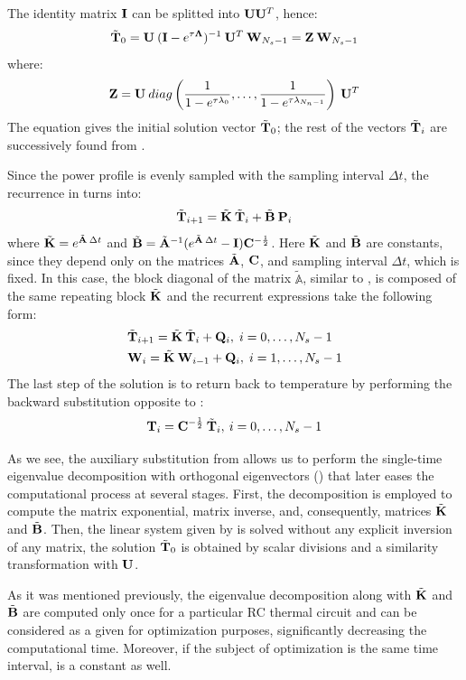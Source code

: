 The identity matrix $\mathbf{I}$ can be splitted into $\mathbf{U} \mathbf{U}^T$, hence:
\[
  \tilde{\mathbf{T}}_0 = \mathbf{U} \: (\mathbf{I} - e^{\tau \mathbf{\Lambda}})^{-1} \: \mathbf{U}^T \: \mathbf{W}_{N_s - 1} = \mathbf{Z} \: \mathbf{W}_{N_s - 1}
\]
where:
\begin{equation} \label{eq:m-matrix}
  \mathbf{Z} = \mathbf{U} \: diag \left( \frac{1}{1 - e^{\tau \lambda_0}}, \dots, \frac{1}{1 - e^{\tau \lambda_{N_n - 1}}} \right) \: \mathbf{U}^T
\end{equation}
The equation gives the initial solution vector $\tilde{\mathbf{T}}_0$; the rest of the vectors $\tilde{\mathbf{T}}_i$ are successively found from .

Since the power profile is evenly sampled with the sampling interval $\Delta t$, the recurrence in  turns into:
\[
  \tilde{\mathbf{T}}_{i+1} = \tilde{\mathbf{K}} \: \tilde{\mathbf{T}}_i + \tilde{\mathbf{B}} \: \mathbf{P}_i
\]
where $\tilde{\mathbf{K}} = e^{\tilde{\mathbf{A}} \: \Delta t}$ and $\tilde{\mathbf{B}} = \tilde{\mathbf{A}}^{-1} ( e^{\tilde{\mathbf{A}} \: \Delta t} - \mathbf{I} ) \mathbf{C}^{-\frac{1}{2}}$. Here $\tilde{\mathbf{K}}$ and $\tilde{\mathbf{B}}$ are constants, since they depend only on the matrices $\tilde{\mathbf{A}}$, $\mathbf{C}$, and sampling interval $\Delta t$, which is fixed. In this case, the block diagonal of the matrix $\tilde{\mathbb{A}}$, similar to , is composed of the same repeating block $\tilde{\mathbf{K}}$ and the recurrent expressions take the following form:
\begin{align}
  & \tilde{\mathbf{T}}_{i + 1} = \tilde{\mathbf{K}} \: \tilde{\mathbf{T}}_i + \mathbf{Q}_i, \; i = 0, \dots, N_s - 1 \nonumber \\
  & \mathbf{W}_i = \tilde{\mathbf{K}} \: \mathbf{W}_{i - 1} + \mathbf{Q}_i, \; i = 1, \dots, N_s - 1 \nonumber
\end{align}
The last step of the solution is to return back to temperature by performing the backward substitution opposite to :
\[
  \mathbf{T}_i = \mathbf{C}^{-\frac{1}{2}} \: \tilde{\mathbf{T}}_i, \: i = 0, \dots, N_s - 1
\]

As we see, the auxiliary substitution from  allows us to perform the single-time eigenvalue decomposition with orthogonal eigenvectors () that later eases the computational process at several stages. First, the decomposition is employed to compute the matrix exponential, matrix inverse, and, consequently, matrices $\tilde{\mathbf{K}}$ and $\tilde{\mathbf{B}}$. Then, the linear system given by  is solved without any explicit inversion of any matrix, the solution $\tilde{\mathbf{T}}_0$ is obtained by scalar divisions and a similarity transformation with $\mathbf{U}$. %

As it was mentioned previously, the eigenvalue decomposition along with $\tilde{\mathbf{K}}$ and $\tilde{\mathbf{B}}$ are computed only once for a particular RC thermal circuit and can be considered as a given for optimization purposes, significantly decreasing the computational time. Moreover, if the subject of optimization is the same time interval,  is a constant as well.
